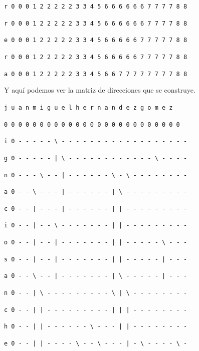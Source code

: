 \documentclass[11pt,a4paper]{article} %
\begin{document}
\texttt{r 0 0 0 1 2 2 2 2 2 3 3 4 5 6 6 6 6 6 6 7 7 7 7 8 8}

\texttt{r 0 0 0 1 2 2 2 2 2 3 3 4 5 6 6 6 6 6 6 7 7 7 7 8 8}

\texttt{e 0 0 0 1 2 2 2 2 2 3 3 4 5 6 6 6 6 6 7 7 7 7 7 8 8}

\texttt{r 0 0 0 1 2 2 2 2 2 3 3 4 5 6 6 6 6 6 7 7 7 7 7 8 8}

\texttt{a 0 0 0 1 2 2 2 2 2 3 3 4 5 6 6 7 7 7 7 7 7 7 7 8 8}\\

\normalsize


Y aquí podemos ver la matriz de direcciones que se construye.\\

\small

\hspace{1,72 em} \texttt{j u a n m i g u e l h e r n a n d e z g o m e z}

\hspace{0,71 em} \texttt{0 0 0 0 0 0 0 0 0 0 0 0 0 0 0 0 0 0 0 0 0 0 0 0 0}

\texttt{i 0 - - - - - \textbackslash{ }- - - - - - - - - - - - - - - - - -}

\texttt{g 0 - - - - - | \textbackslash{ }- - - - - - - - - - - - \textbackslash{ }- - - -}

\texttt{n 0 - - - \textbackslash{ }- - | - - - - - - \textbackslash{ }- \textbackslash{ }- - - - - - - -}

\texttt{a 0 - - \textbackslash{ }- - - | - - - - - - | \textbackslash{ }- - - - - - - - -}

\texttt{c 0 - - | - - - | - - - - - - | | - - - - - - - - -}

\texttt{i 0 - - | - - \textbackslash{ }- - - - - - - | | - - - - - - - - -}

\texttt{o 0 - - | - - | - - - - - - - | | - - - - - \textbackslash{ }- - -}

\texttt{s 0 - - | - - | - - - - - - - | | - - - - - | - - -}

\texttt{a 0 - - \textbackslash{ }- - | - - - - - - - | \textbackslash{ }- - - - - | - - -}

\texttt{n 0 - - | \textbackslash{ }- - - - - - - - - \textbackslash{ }| \textbackslash{ }- - - - - - - -}

\texttt{c 0 - - | | - - - - - - - - - | | | - - - - - - - -}

\texttt{h 0 - - | | - - - - - - \textbackslash{ }- - - | | - - - - - - - -}

\texttt{e 0 - - | | - - - - \textbackslash{ }- - \textbackslash{ }- - - | - \textbackslash{ }- - - - \textbackslash{ }-} 
\end{document}
